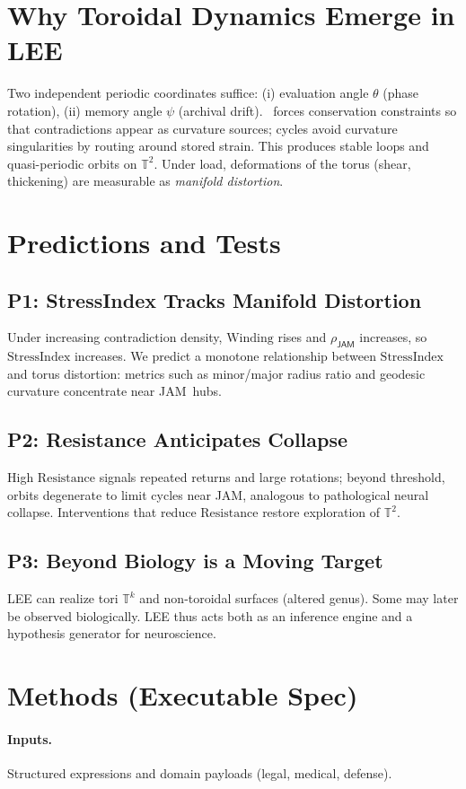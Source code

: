 \documentclass[11pt]{article}
\newcommand{\Jam}{\textsf{JAM}}
\newcommand{\T}{\mathbb{T}}
\newcommand{\Stress}{\mathrm{StressIndex}}
\newcommand{\Resist}{\mathrm{Resistance}}
\newcommand{\Wind}{\mathrm{Winding}}
\newcommand{\GLMS}{\mathrm{GLMS}}
\begin{document}
\section{Why Toroidal Dynamics Emerge in LEE}
Two independent periodic coordinates suffice: (i) evaluation angle $\theta$ (phase rotation), (ii) memory angle $\psi$ (archival drift). 
\GLMS\ forces conservation constraints so that contradictions appear as curvature sources; cycles avoid curvature singularities by routing around stored strain. 
This produces stable loops and quasi-periodic orbits on $\T^2$. Under load, deformations of the torus (shear, thickening) are measurable as \emph{manifold distortion}.

\section{Predictions and Tests}
\subsection*{P1: StressIndex Tracks Manifold Distortion}
Under increasing contradiction density, $\Wind$ rises and $\rho_{\Jam}$ increases, so $\Stress$ increases. We predict a monotone relationship between $\Stress$ and torus distortion: metrics such as minor/major radius ratio and geodesic curvature concentrate near \Jam\ hubs.

\subsection*{P2: Resistance Anticipates Collapse}
High $\Resist$ signals repeated returns and large rotations; beyond threshold, orbits degenerate to limit cycles near \Jam, analogous to pathological neural collapse. Interventions that reduce $\Resist$ restore exploration of $\T^2$.

\subsection*{P3: Beyond Biology is a Moving Target}
LEE can realize tori $\T^k$ and non-toroidal surfaces (altered genus). Some may later be observed biologically. LEE thus acts both as an inference engine and a hypothesis generator for neuroscience.

\section{Methods (Executable Spec)}
\paragraph{Inputs.} Structured expressions and domain payloads (legal, medical, defense). 
\end{document}
